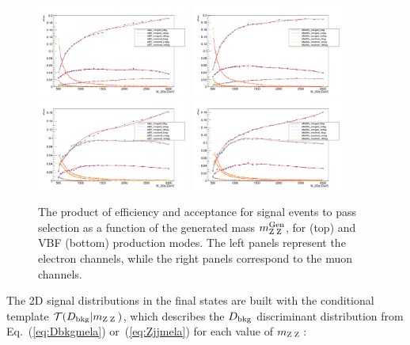  \begin{figure}[htbp]
 \centering
 \includegraphics[width=0.45\textwidth]{figures/HighMassSearches/Efficiency/eff_ggh_isEE.png}
 \includegraphics[width=0.45\textwidth]{figures/HighMassSearches/Efficiency/eff_ggh_isMuMu.png}\\
 \includegraphics[width=0.45\textwidth]{figures/HighMassSearches/Efficiency/eff_vbf_isEE.png}
 \includegraphics[width=0.45\textwidth]{figures/HighMassSearches/Efficiency/eff_vbf_isMuMu.png}\\
 \caption{
     The product of efficiency and acceptance for signal events to pass selection as a function of the generated mass $m_{\mathrm{Z}\hspace{0.2em}\mathrm{Z}\hspace{0.2em}}^{\mathrm{Gen}}$, for \ggF (top) and VBF (bottom) production modes.
     The left panels represent the electron channels, while the right panels correspond to the muon channels.
 \label{fig:eff}
 }
 \end{figure}

 The 2D signal distributions in the final states are built with the conditional template ${\cal T}(D_{\mathrm{bkg}}|m_{\mathrm{Z}\hspace{0.2em}\mathrm{Z}\hspace{0.2em}})$,
 which describes the $D_{\mathrm{bkg}}$ discriminant distribution from Eq.~(\ref{eq:Dbkgmela}) or~(\ref{eq:Zjjmela})
 for each value of $m_{\mathrm{Z}\hspace{0.2em}\mathrm{Z}\hspace{0.2em}}$:

